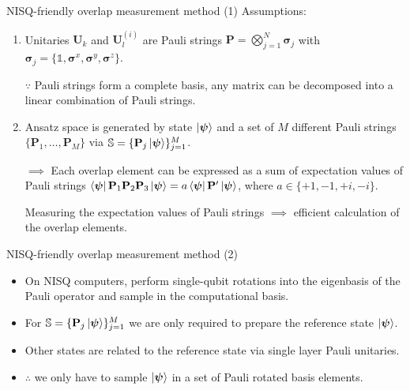 \documentclass{beamer}
\newcommand{\sigmamat}{\boldsymbol\sigma}
\newcommand{\psivec}{\boldsymbol\psi}
\newcommand{\Pmat}{\mathbf{P}}
\newcommand{\Umat}{\mathbf{U}}
\newcommand{\id}{\mathds{1}}
\newcommand{\Sset}{\mathbb{S}}
\begin{document}
	\begin{frame}{NISQ-friendly overlap measurement method (1)}
		Assumptions:
		\begin{enumerate}
			\item Unitaries $\Umat_k$ and $\Umat_l^{(i)}$ are Pauli strings $\Pmat = \bigotimes_{j=1}^N \sigmamat_j$ with $\sigmamat_j = \{\id, \sigmamat^{x}, \sigmamat^{y}, \sigmamat^{z}\}$.
					
					$\because$ Pauli strings form a complete basis, any matrix can be decomposed into a linear combination of Pauli strings.
					
			\item Ansatz space is generated by state $\ket{\psivec}$ and a set of $M$ different Pauli strings $\{\Pmat_1, \dots, \Pmat_M\}$ via $\Sset = \{\Pmat_j\ket{\psivec}\}_{j=1}^M$.
			
					$\implies$ Each overlap element can be expressed as a sum of expectation values of Pauli strings $\bra{\psivec}\Pmat_1 \Pmat_2 \Pmat_3\ket{\psivec} = a\bra{\psivec}\Pmat'\ket{\psivec}$, where $a \in \{+1, -1, +i, -i\}$.
					
					Measuring the expectation values of Pauli strings $\implies$ efficient calculation of the overlap elements.
		\end{enumerate}
		
	\end{frame}
	
	\begin{frame}{NISQ-friendly overlap measurement method (2)}
		\begin{itemize}
			\item On NISQ computers, perform single-qubit rotations into the eigenbasis of the Pauli operator and sample in the computational basis.
			\item For $\Sset = \{\Pmat_j\ket{\psivec}\}_{j=1}^M$ we are only required to prepare the reference state $\ket{\psivec}$.
			\item Other states are related to the reference state via single layer Pauli unitaries.
			\item $\therefore$ we only have to sample $\ket{\psivec}$ in a set of Pauli rotated basis elements.
		\end{itemize}
	\end{frame}
\end{document}
